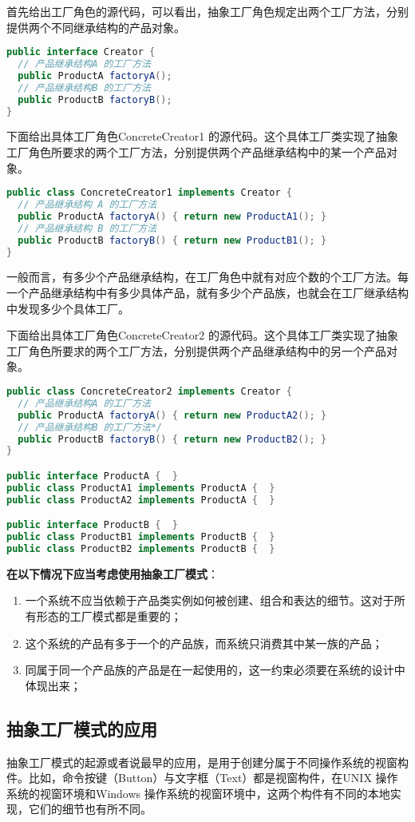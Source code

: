 \documentclass[../main.tex]{subfiles}
\begin{document}
%
首先给出工厂角色的源代码，可以看出，抽象工厂角色规定出两个工厂方法，分别提供两个不同继承结构的产品对象。
\begin{lstlisting}[language=java]
public interface Creator {
  // 产品继承结构A 的工厂方法
  public ProductA factoryA();
  // 产品继承结构B 的工厂方法
  public ProductB factoryB();
}
\end{lstlisting}
%
\noindent 下面给出具体工厂角色ConcreteCreator1 的源代码。这个具体工厂类实现了抽象工厂角色所要求的两个工厂方法，分别提供两个产品继承结构中的某一个产品对象。
%
\begin{lstlisting}[language=java]
public class ConcreteCreator1 implements Creator {
  // 产品继承结构 A 的工厂方法
  public ProductA factoryA() { return new ProductA1(); }
  // 产品继承结构 B 的工厂方法
  public ProductB factoryB() { return new ProductB1(); }
}
\end{lstlisting}
%
一般而言，有多少个产品继承结构，在工厂角色中就有对应个数的个工厂方法。每一个产品继承结构中有多少具体产品，就有多少个产品族，也就会在工厂继承结构中发现多少个具体工厂。

下面给出具体工厂角色ConcreteCreator2 的源代码。这个具体工厂类实现了抽象工厂角色所要求的两个工厂方法，分别提供两个产品继承结构中的另一个产品对象。
\begin{lstlisting}[language=java]
public class ConcreteCreator2 implements Creator {
  // 产品继承结构A 的工厂方法
  public ProductA factoryA() { return new ProductA2(); }
  // 产品继承结构B 的工厂方法*/
  public ProductB factoryB() { return new ProductB2(); }
}

public interface ProductA {  }
public class ProductA1 implements ProductA {  }
public class ProductA2 implements ProductA {  }

public interface ProductB {  }
public class ProductB1 implements ProductB {  }
public class ProductB2 implements ProductB {  }
\end{lstlisting}
%
\textbf{在以下情况下应当考虑使用抽象工厂模式}：
\begin{enumerate}
  \item 一个系统不应当依赖于产品类实例如何被创建、组合和表达的细节。这对于所有形态的工厂模式都是重要的；
  \item 这个系统的产品有多于一个的产品族，而系统只消费其中某一族的产品；
  \item 同属于同一个产品族的产品是在一起使用的，这一约束必须要在系统的设计中体现出来；
\end{enumerate}
%
\subsection{抽象工厂模式的应用}
\noindent 抽象工厂模式的起源或者说最早的应用，是用于创建分属于不同操作系统的视窗构件。比如，命令按键（Button）与文字框（Text）都是视窗构件，在UNIX 操作系统的视窗环境和Windows 操作系统的视窗环境中，这两个构件有不同的本地实现，它们的细节也有所不同。
\end{document}
